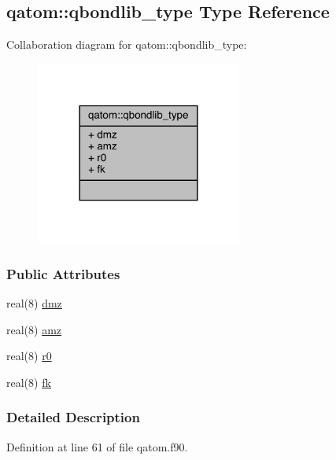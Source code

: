 \hypertarget{structqatom_1_1qbondlib__type}{\subsection{qatom\-:\-:qbondlib\-\_\-type Type Reference}
\label{structqatom_1_1qbondlib__type}
}


Collaboration diagram for qatom\-:\-:qbondlib\-\_\-type\-:
\nopagebreak
\begin{figure}[H]
\begin{center}
\leavevmode
\includegraphics[width=192pt]{structqatom_1_1qbondlib__type__coll__graph}
\end{center}
\end{figure}
\subsubsection*{Public Attributes}
\begin{DoxyCompactItemize}
\item 
real(8) \hyperlink{structqatom_1_1qbondlib__type_a9247734d230e83f66b0a479f0bc41e3c}{dmz}
\item 
real(8) \hyperlink{structqatom_1_1qbondlib__type_a21d052a158085f69d569d32c89677a06}{amz}
\item 
real(8) \hyperlink{structqatom_1_1qbondlib__type_aba22d5e882d3d0f9335be97dc3a4ebe4}{r0}
\item 
real(8) \hyperlink{structqatom_1_1qbondlib__type_a8dfecaff6bb3224772bd7baeebefda96}{fk}
\end{DoxyCompactItemize}


\subsubsection{Detailed Description}


Definition at line 61 of file qatom.\-f90.



